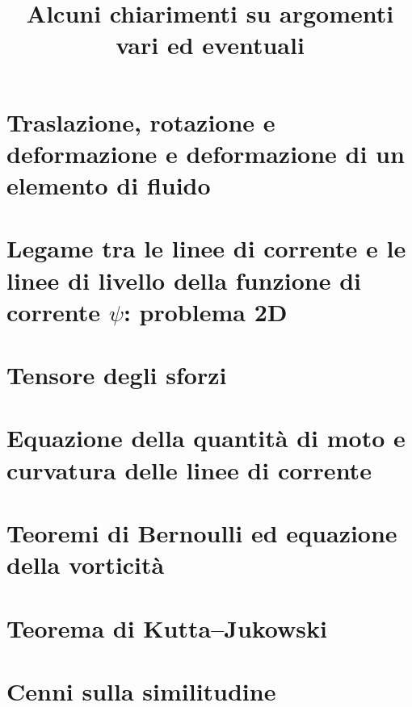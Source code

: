 \documentclass[11pt,fleqn]{article}
\title{Alcuni chiarimenti su argomenti vari ed eventuali}
\begin{document}
\maketitle

\tableofcontents


\section{Traslazione, rotazione e deformazione e deformazione di un elemento di fluido}

\clearpage \newpage

\section{Legame tra le linee di corrente e le linee di livello della funzione di corrente $\psi$: problema 2D}

\clearpage \newpage

\section{Tensore degli sforzi}

\clearpage \newpage

\section{Equazione della quantità di moto e curvatura delle linee di corrente}

\clearpage \newpage

\section{Teoremi di Bernoulli ed equazione della vorticità}

\clearpage \newpage

\section{Teorema di Kutta--Jukowski}

\clearpage \newpage

\section{Cenni sulla similitudine}

\clearpage \newpage
\end{document}
